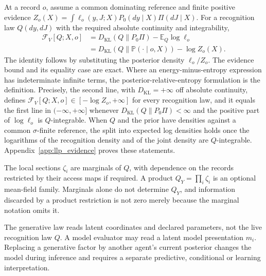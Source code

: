 At a record $o$, assume a common dominating reference and finite positive evidence
$Z_o(X)=\int\ell_o(y,J;X)P_0(dy\mid X)\Pi(dJ\mid X)$. For a recognition law $Q(dy,dJ)$ with the required absolute continuity and integrability,
\begin{equation}
\begin{split}
\mathcal F_V[Q;X,o]
&=D_{\mathrm{KL}}(Q\|P_0\Pi)-\mathbb E_Q\log\ell_o\\
&=D_{\mathrm{KL}}(Q\|\mathbb P(\cdot\mid o,X))-\log Z_o(X).
\end{split}
\label{eq:collective_vfe}
\end{equation}
The identity follows by substituting the posterior density $\ell_o/Z_o$. The evidence bound and its equality case are exact. Where an energy-minus-entropy expression has indeterminate infinite terms, the posterior-relative-entropy formulation is the definition. Precisely, the second line, with $D_{\mathrm{KL}}=+\infty$ off absolute continuity, defines $\mathcal F_V[Q;X,o]\in[-\log Z_o,+\infty]$ for every recognition law, and it equals the first line in $(-\infty,+\infty]$ whenever $D_{\mathrm{KL}}(Q\|P_0\Pi)<\infty$ and the positive part of $\log\ell_o$ is $Q$-integrable. When $Q$ and the prior have densities against a common $\sigma$-finite reference, the split into expected log densities holds once the logarithms of the recognition density and of the joint density are $Q$-integrable. Appendix~\ref{app:llp_evidence} proves these statements.

The local sections $\zeta_i$ are marginals of $Q$, with dependence on the records restricted by their access maps if required. A product $Q_Y=\prod_i\zeta_i$ is an optional mean-field family. Marginals alone do not determine $Q_Y$, and information discarded by a product restriction is not zero merely because the marginal notation omits it.

The generative law reads latent coordinates and declared parameters, not the live recognition law $Q$. A model evaluator may read a latent model presentation $m_i$. Replacing a generative factor by another agent's current posterior changes the model during inference and requires a separate predictive, conditional or learning interpretation.

